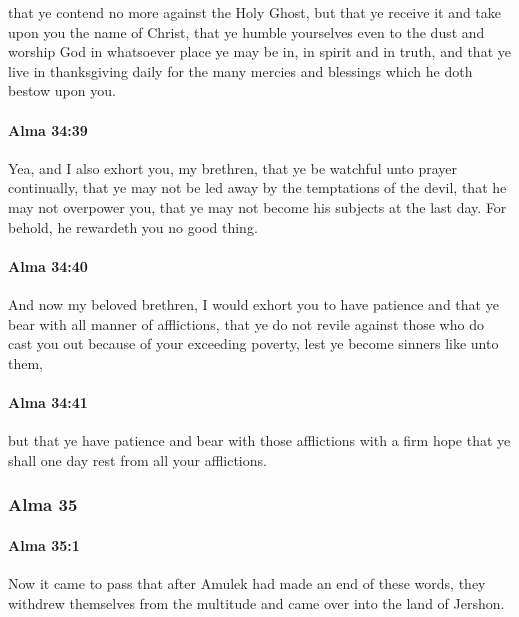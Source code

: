 			that ye contend no more against the Holy Ghost,
			but that ye receive it and take upon you the name of Christ,
			that ye humble yourselves even to the dust
			and worship God in whatsoever place ye may be in,
			in spirit and in truth,
			and that ye live in thanksgiving daily
			for the many mercies and blessings which he doth bestow upon you.

		\paragraph{Alma 34:39} %
			\label{ALMA-34-39}

			Yea, and I also exhort you, my brethren,
			that ye be watchful unto prayer continually,
			that ye may not be led away by the temptations of the devil,
			that he may not overpower you,
			that ye may not become his subjects at the last day.
			For behold, he rewardeth you no good thing.

		\paragraph{Alma 34:40} %
			\label{ALMA-34-40}

			And now my beloved brethren, I would exhort you to have patience
			and that ye bear with all manner of afflictions,
			that ye do not revile against those
			who do cast you out because of your exceeding poverty,
			lest ye become sinners like unto them,

		\paragraph{Alma 34:41} %
			\label{ALMA-34-41}

			but that ye have patience and bear with those afflictions
			with a firm hope that ye shall one day rest from all your afflictions.

	\subsubsection{Alma 35} %
		\label{ALMA-35}
		
		\paragraph{Alma 35:1} %
			\label{ALMA-35-1}

			Now it came to pass that after Amulek had made an end of these words,
			they withdrew themselves from the multitude
			and came over into the land of Jershon.

